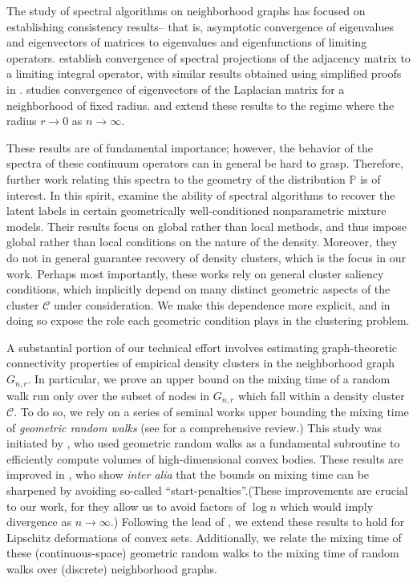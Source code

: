 \documentclass[11pt,twoside]{article}
\newcommand{\1}{\mathbf{1}}
\newcommand{\Pbb}{\mathbb{P}}
\newcommand{\Cset}{\mathcal{C}}
\begin{document}
The study of spectral algorithms on neighborhood graphs has focused on establishing consistency results-- that is, asymptotic convergence of eigenvalues and eigenvectors of matrices to eigenvalues and eigenfunctions of limiting operators. \citet{koltchinskii2000} establish convergence of spectral projections of the adjacency matrix to a limiting integral operator, with similar results obtained using simplified proofs in \citet{rosasco10}. \citet{vonluxburg2008} studies convergence of eigenvectors of the Laplacian matrix for a neighborhood of fixed radius. \citet{belkin07} and \citet{garciatrillos18} extend these results to the regime where the radius $r \to 0$ as $n \to \infty$.


These results are of fundamental importance; however, the behavior of the spectra of these continuum operators can in general be hard to grasp. Therefore, further work relating this spectra to the geometry of the distribution $\Pbb$ is of interest. In this spirit, \citet{shi2009,schiebinger2015,garciatrillos19} examine the ability of  
spectral algorithms to recover the latent labels in certain geometrically well-conditioned nonparametric mixture models. Their results focus on global rather than local 
methods, and thus impose global rather than local conditions on the nature
of the density. Moreover, they do not in general guarantee recovery of density 
clusters, which is the focus in our work. Perhaps most importantly, these works
rely on general cluster saliency conditions, which implicitly depend on many
distinct geometric aspects of the cluster $\Cset$ under consideration. We make
this dependence more explicit, and in doing so expose the role each geometric
condition plays in the clustering problem. 

A substantial portion of our technical effort involves estimating graph-theoretic connectivity properties of empirical density clusters in the neighborhood graph $G_{n,r}$. In particular, we prove an upper bound on the mixing time of a random walk run only over the subset of nodes in $G_{n,r}$ which fall within a density cluster $\Cset$. To do so, we rely on a series of seminal works upper bounding the mixing time of \emph{geometric random walks} (see \citet{vempala2005} for a comprehensive review.)  This study was initiated by \citet{dyer1991}, who used geometric random walks as a fundamental subroutine to efficiently compute volumes of high-dimensional convex bodies. These results are improved in \citet{lovasz1990,kannan97,kannan06}, who show \textit{inter alia} that the bounds on mixing time can be sharpened by avoiding so-called ``start-penalties''.(These improvements are crucial to our work, for they allow us to avoid factors of $\log n$ which would imply divergence as $n \to \infty$.) Following the lead of \citet{abbasi-yadkori2016,abbasi-yadkori2016a}, we extend these results to hold for Lipschitz deformations of convex sets. Additionally, we relate the mixing time of these (continuous-space) geometric random walks to the mixing time of random walks over (discrete) neighborhood graphs.
\end{document}
